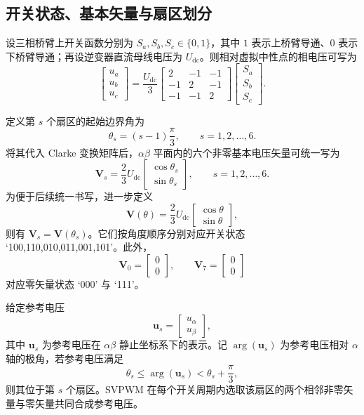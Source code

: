 \documentclass[a4paper, 12pt]{ctexart}
\newcommand{\Udc}{U_{\mathrm{dc}}}
\begin{document}
\subsection{开关状态、基本矢量与扇区划分}

设三相桥臂上开关函数分别为 $S_a,S_b,S_c \in \{0,1\}$，其中 $1$ 表示上桥臂导通、$0$ 表示下桥臂导通；再设逆变器直流母线电压为 $\Udc$。则相对虚拟中性点的相电压可写为
\[
  \begin{bmatrix}
    u_a \\ u_b \\ u_c
  \end{bmatrix}
  =
  \frac{\Udc}{3}
  \begin{bmatrix}
    2  & -1 & -1 \\
    -1 & 2  & -1 \\
    -1 & -1 & 2
  \end{bmatrix}
  \begin{bmatrix}
    S_a \\ S_b \\ S_c
  \end{bmatrix}.
\]

定义第 $s$ 个扇区的起始边界角为
\[
  \theta_s = (s - 1)\frac{\pi}{3},
  \qquad s = 1,2,\dots,6.
\]
将其代入 Clarke 变换矩阵后，$\alpha\beta$ 平面内的六个非零基本电压矢量可统一写为
\[
  \boldsymbol V_s
  =
  \frac{2}{3}\Udc
  \begin{bmatrix}
    \cos\theta_s \\
    \sin\theta_s
  \end{bmatrix},
  \qquad
  s = 1,2,\dots,6.
\]
为便于后续统一书写，进一步定义
\[
  \boldsymbol V(\theta)
  =
  \frac{2}{3}\Udc
  \begin{bmatrix}
    \cos\theta \\
    \sin\theta
  \end{bmatrix},
\]
则有 $\boldsymbol V_s = \boldsymbol V(\theta_s)$。它们按角度顺序分别对应开关状态 `100,110,010,011,001,101'。此外，
\[
  \boldsymbol V_0 =
  \begin{bmatrix}
    0 \\ 0
  \end{bmatrix},
  \qquad
  \boldsymbol V_7 =
  \begin{bmatrix}
    0 \\ 0
  \end{bmatrix}
\]
对应零矢量状态 `000' 与 `111'。

给定参考电压
\[
  \boldsymbol u_s =
  \begin{bmatrix}
    u_\alpha \\ u_\beta
  \end{bmatrix},
\]
其中 $\boldsymbol u_s$ 为参考电压在 $\alpha\beta$ 静止坐标系下的表示。记 $\arg(\boldsymbol u_s)$ 为参考电压相对 $\alpha$ 轴的极角，若参考电压满足
\[
  \theta_s \le \arg(\boldsymbol u_s) < \theta_s + \frac{\pi}{3},
\]
则其位于第 $s$ 个扇区。SVPWM 在每个开关周期内选取该扇区的两个相邻非零矢量与零矢量共同合成参考电压。
\end{document}
